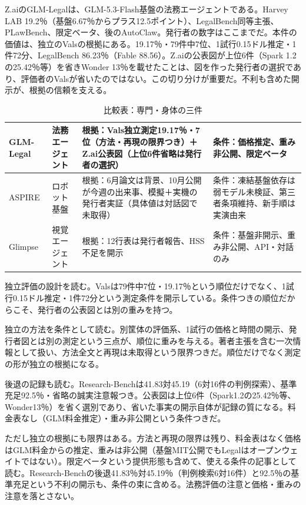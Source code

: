 \documentclass[lualatex,a4paper,10pt]{jlreq}
\begin{document}
Z.aiのGLM-Legalは、GLM-5.3-Flash基盤の法務エージェントである。Harvey LAB 19.2％（基盤6.67％からプラス12.5ポイント）、LegalBench同等主張、PLawBench、限定ベータ、後のAutoClaw。発行者の数字はここまでだ。本件の価値は、独立のValsの根拠にある。19.17％・79件中7位、1試行0.15ドル推定・1件72分、LegalBench 86.23％（Fable 88.56）。Z.aiの公表図が上位6件（Spark 1.2の25.42％等）を省きWonder 13％を載せたことは、図を作った発行者の選択であり、評価者のValsが省いたのではない。この切り分けが重要だ。不利も含めた開示が、根拠の信頼を支える。
\cite{B55,B53,B54}

\begin{table}[htbp]\centering\footnotesize
\caption{比較表：専門・身体の三件}
\begin{tabularx}{0.96\linewidth}{@{}lXXX@{}}
\toprule
GLM-Legal & 法務エージェント & 根拠：Vals独立測定19.17％・7位（方法・再現の限界つき）＋Z.ai公表図（上位6件省略は発行者の選択） & 条件：価格推定、重み非公開、限定ベータ \cite{B55,B53,B54} \\
\midrule
ASPIRE & ロボット基盤 & 根拠：6月論文は背景、10月公開が今週の出来事、模擬＋実機の発行者実証（具体値は対話図で未取得） & 条件：凍結基盤依存は弱モデル未検証、第三者条項維持、新手順は実演由来 \cite{B57,B56,B89} \\
\midrule
Glimpse & 視覚エージェント & 根拠：12行表は発行者報告、HSS不足を開示 & 条件：基盤非開示、重み非公開、API・対話のみ \cite{B58,B59,B88} \\
\bottomrule
\end{tabularx}
\end{table}


独立評価の設計を読む。Valsは79件中7位・19.17％という順位だけでなく、1試行0.15ドル推定・1件72分という測定条件を開示している。条件つきの順位だからこそ、発行者の公表図とは別の重みを持つ。
\cite{B55,B53,B54}


独立の方法を条件として読む。別筐体の評価系、1試行の価格と時間の開示、発行者図とは別の測定という三点が、順位に重みを与える。著者主張を含む一次情報として扱い、方法全文と再現は未取得という限界つきだ。順位だけでなく測定の形が独立の根拠になる。
\cite{B55,B53,B54}


後退の記録も読む。Research-Benchは41.83対45.19（6対16件の判例探索）、基準充足92.5％・省略の誠実注意報つき。公表図は上位6件（Spark1.2の25.42％等、Wonder13％）を省く選別であり、省いた事実の開示自体が記録の質になる。料金表なし（GLM料金推定）・重み非公開という条件つきだ。
\cite{B55,B53,B54}


ただし独立の根拠にも限界はある。方法と再現の限界は残り、料金表はなく価格はGLM料金からの推定、重みは非公開（基盤MIT公開でもLegalはオープンウェイトではない）。限定ベータという提供形態も含めて、使える条件の記事として読む。Research-Benchの後退41.83％対45.19％（判例検索6対16件）と92.5％の基準充足という不利の開示も、条件の束に含める。法務評価の注意と価格・重みの注意を落とさない。
\cite{B55,B53,B54}
\end{document}
